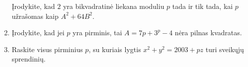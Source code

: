 \begin{enumerate}
    Įrodykite, kad $2$ yra bikvadratinė liekana moduliu $p$ tada ir tik tada,
    kai $p$ užrašomas kaip $A^2 + 64B^2$.
  \item \text{[JBMO 2007]} Įrodykite, kad jei $p$ yra pirminis, tai $A = 7p
    + 3^p - 4$ nėra pilnas kvadratas.
  \item \text{[Kazakhstan 2004]} Raskite visus pirminius $p$, su kuriais
    lygtis $x^2+y^2=2003+pz$ turi sveikųjų sprendinių.

\end{enumerate}
